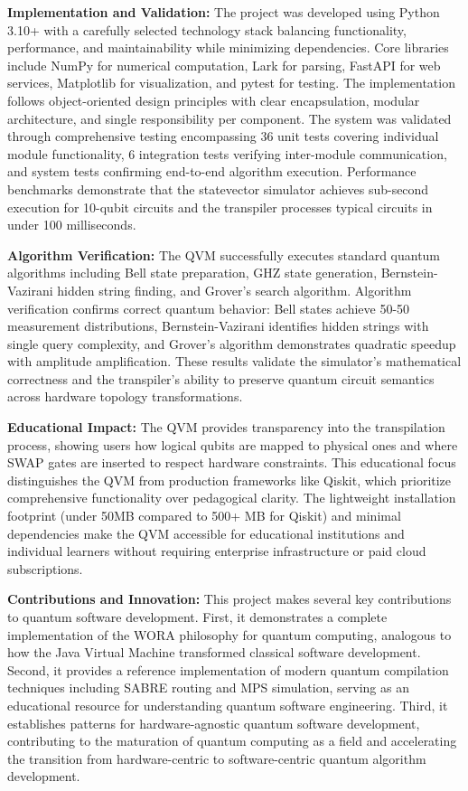 \textbf{Implementation and Validation:} The project was developed using Python 3.10+ with a carefully selected technology stack balancing functionality, performance, and maintainability while minimizing dependencies. Core libraries include NumPy for numerical computation, Lark for parsing, FastAPI for web services, Matplotlib for visualization, and pytest for testing. The implementation follows object-oriented design principles with clear encapsulation, modular architecture, and single responsibility per component. The system was validated through comprehensive testing encompassing 36 unit tests covering individual module functionality, 6 integration tests verifying inter-module communication, and system tests confirming end-to-end algorithm execution. Performance benchmarks demonstrate that the statevector simulator achieves sub-second execution for 10-qubit circuits and the transpiler processes typical circuits in under 100 milliseconds.

\textbf{Algorithm Verification:} The QVM successfully executes standard quantum algorithms including Bell state preparation, GHZ state generation, Bernstein-Vazirani hidden string finding, and Grover's search algorithm. Algorithm verification confirms correct quantum behavior: Bell states achieve 50-50 measurement distributions, Bernstein-Vazirani identifies hidden strings with single query complexity, and Grover's algorithm demonstrates quadratic speedup with amplitude amplification. These results validate the simulator's mathematical correctness and the transpiler's ability to preserve quantum circuit semantics across hardware topology transformations.

\textbf{Educational Impact:} The QVM provides transparency into the transpilation process, showing users how logical qubits are mapped to physical ones and where SWAP gates are inserted to respect hardware constraints. This educational focus distinguishes the QVM from production frameworks like Qiskit, which prioritize comprehensive functionality over pedagogical clarity. The lightweight installation footprint (under 50MB compared to 500+ MB for Qiskit) and minimal dependencies make the QVM accessible for educational institutions and individual learners without requiring enterprise infrastructure or paid cloud subscriptions.

\textbf{Contributions and Innovation:} This project makes several key contributions to quantum software development. First, it demonstrates a complete implementation of the WORA philosophy for quantum computing, analogous to how the Java Virtual Machine transformed classical software development. Second, it provides a reference implementation of modern quantum compilation techniques including SABRE routing and MPS simulation, serving as an educational resource for understanding quantum software engineering. Third, it establishes patterns for hardware-agnostic quantum software development, contributing to the maturation of quantum computing as a field and accelerating the transition from hardware-centric to software-centric quantum algorithm development.

